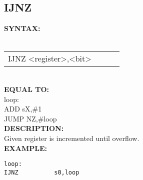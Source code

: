 {                \subsection{IJNZ}
                \textbf{SYNTAX:}\\
                \\ {
                    \texttt{}
                    \begin{tabular}[h!]{llll}
                            { \color{highlight_instruction} IJNZ   } { \color{highlight_symbol} <register>,<bit> }
                            { \color{highlight_comment}  }\\
                    \end{tabular}
                    }\\
                    \textbf{EQUAL TO:}\\
                    { \color{highlight_label} loop:    } { \color{highlight_symbol}       }\\
                    { \color{highlight_instruction} ADD    } { \color{highlight_symbol}      sX,\#1 }\\
                    { \color{highlight_instruction} JUMP    } { \color{highlight_symbol}     NZ,\#loop }\\
                \textbf{DESCRIPTION:}\\
                Given register is incremented until overflow.\\
                \textbf{EXAMPLE:}\\
                        \begin{code}[h!]
                        {\color{highlight_symbol}\verb'loop:          ' }\\
                        {\color{highlight_symbol}\verb'IJNZ          s0,loop' }\\
                        \end{code}
}
